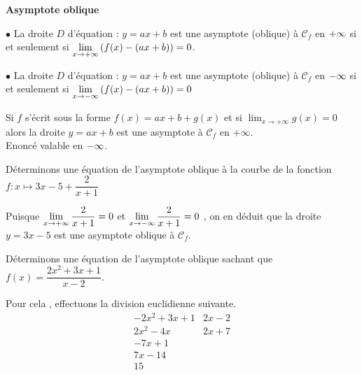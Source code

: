 \textbf{Asymptote  oblique}
\begin{definition}
$ \bullet $  La droite $D$  d'équation : $ y=ax+b $   est  une   asymptote (oblique)    à  $ \mathscr{C}_{f}$   en $ +\infty $ si et seulement si
   $ \displaystyle\lim_{ x \to +\infty}\left(f(x)-(ax+b)\right)=0$. 
  
    $ \bullet $  La droite $D$  d'équation : $ y=ax+b $   est  une   asymptote  (oblique)   à  $ \mathscr{C}_{f}$   en $ -\infty $ si et seulement si
   $ \displaystyle\lim_{ x \to -\infty}\left(f(x)-(ax+b)\right)=0$ 
   \end{definition}
  \begin{center}
\end{center}  

\begin{remark}
  Si $ f $ s'écrit sous la forme $ f(x)= ax+b + g(x) $ et si $\displaystyle \lim_{x \to +\infty}g(x)=0 $  alors la droite $ y=ax+b $ est une asymptote à  $ \mathcal{C}_{f} $ en $ +\infty. $\\
 
 Enoncé valable en $ -\infty $.
\end{remark}


\begin{example}

Déterminons une équation de l'asymptote oblique  à la courbe de la fonction $ f: x\longmapsto 3x-5+\dfrac{2}{x+1} $


\medskip

Puisque $ \displaystyle\lim_{x\to +\infty}\dfrac{2}{x+1}  =0 $ et $ \displaystyle\lim_{x\to -\infty}\dfrac{2}{x+1}  =0 $ , on en déduit que la droite $ y= 3x-5$  est une asymptote oblique  à  $ \mathscr{C}_{f}$.  
\end{example}
\begin{example}
 
  Déterminons une équation de l'asymptote oblique sachant que $ f(x)= \dfrac{2x^{2}+3x+1}{x-2}$.
\end{example}
Pour cela ,  effectuons la division euclidienne suivante. 
\[
\begin{array}{r|r}
-2x^2 + 3x + 1 & 2x - 2 \\
2x^2 - 4x      & 2x + 7 \\
\hline
-7x + 1        &        \\
7x - 14        &        \\
\hline
15             &
\end{array}
\]

